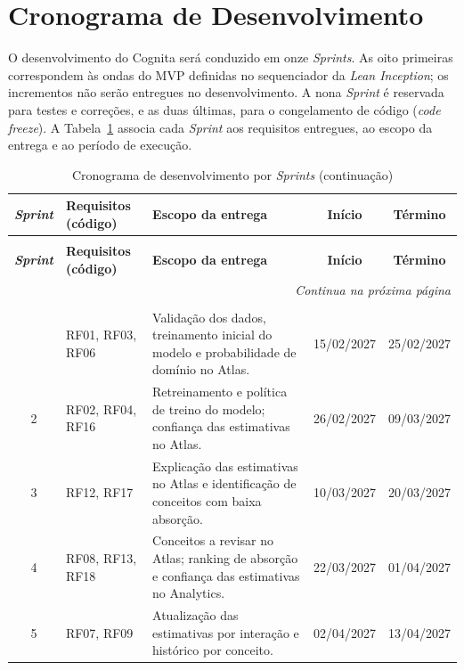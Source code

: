 \section{Cronograma de Desenvolvimento}
\label{sec:cronograma}

O desenvolvimento do Cognita será conduzido em onze \textit{Sprints}. As
oito primeiras correspondem às ondas do MVP definidas no sequenciador da
\textit{Lean Inception}; os incrementos
não serão entregues no desenvolvimento. A nona \textit{Sprint} é
reservada para testes e correções, e as duas últimas, para o congelamento de código
(\textit{code freeze}). A Tabela~\ref{tab:cronograma-ondas} associa cada
\textit{Sprint} aos requisitos entregues, ao escopo da entrega e ao período
de execução.

{\small
\begin{longtable}{c>{\raggedright\arraybackslash}p{2.3cm}>{\raggedright\arraybackslash}p{6.3cm}cc}
\caption{Cronograma de desenvolvimento por \textit{Sprints}}
\label{tab:cronograma-ondas} \\
\hline
\textbf{\textit{Sprint}} & \textbf{Requisitos (código)} & \textbf{Escopo da entrega} & \textbf{Início} & \textbf{Término} \\
\hline
\endfirsthead
\caption[]{Cronograma de desenvolvimento por \textit{Sprints} (continuação)} \\
\hline
\textbf{\textit{Sprint}} & \textbf{Requisitos (código)} & \textbf{Escopo da entrega} & \textbf{Início} & \textbf{Término} \\
\hline
\endhead
\hline
\multicolumn{5}{r}{\textit{Continua na próxima página}} \\
\endfoot
\hline
\multicolumn{5}{l}{Fonte: Elaborado pelos autores.} \\
\endlastfoot
1 & RF01, RF03, RF06 & Validação dos dados, treinamento inicial do modelo e probabilidade de domínio no Atlas. & 15/02/2027 & 25/02/2027 \\
\hline
2 & RF02, RF04, RF16 & Retreinamento e política de treino do modelo; confiança das estimativas no Atlas. & 26/02/2027 & 09/03/2027 \\
\hline
3 & RF12, RF17 & Explicação das estimativas no Atlas e identificação de conceitos com baixa absorção. & 10/03/2027 & 20/03/2027 \\
\hline
4 & RF08, RF13, RF18 & Conceitos a revisar no Atlas; ranking de absorção e confiança das estimativas no Analytics. & 22/03/2027 & 01/04/2027 \\
\hline
5 & RF07, RF09 & Atualização das estimativas por interação e histórico por conceito. & 02/04/2027 & 13/04/2027 \\

\end{longtable}}
